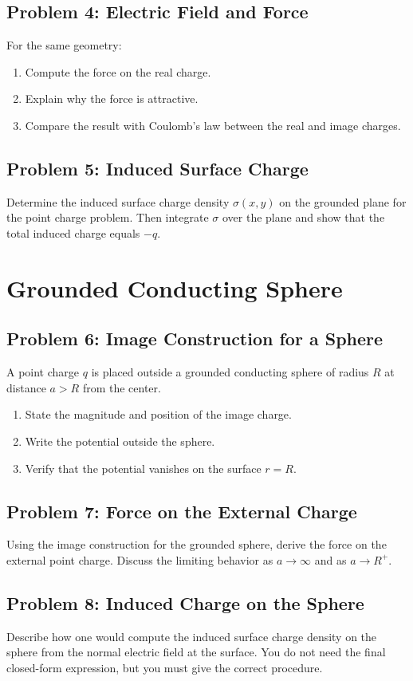 \documentclass[hidelinks]{article}
\begin{document}
\subsection{Problem 4: Electric Field and Force}
For the same geometry:
\begin{enumerate}[label=\alph*)]
\item Compute the force on the real charge.
\item Explain why the force is attractive.
\item Compare the result with Coulomb's law between the real and image charges.
\end{enumerate}

\subsection{Problem 5: Induced Surface Charge}
Determine the induced surface charge density $\sigma(x,y)$ on the grounded plane for the point charge problem. Then integrate $\sigma$ over the plane and show that the total induced charge equals $-q$.

\section{Grounded Conducting Sphere}
\subsection{Problem 6: Image Construction for a Sphere}
A point charge $q$ is placed outside a grounded conducting sphere of radius $R$ at distance $a>R$ from the center.
\begin{enumerate}[label=\alph*)]
\item State the magnitude and position of the image charge.
\item Write the potential outside the sphere.
\item Verify that the potential vanishes on the surface $r=R$.
\end{enumerate}

\subsection{Problem 7: Force on the External Charge}
Using the image construction for the grounded sphere, derive the force on the external point charge. Discuss the limiting behavior as $a\to \infty$ and as $a\to R^+$.

\subsection{Problem 8: Induced Charge on the Sphere}
Describe how one would compute the induced surface charge density on the sphere from the normal electric field at the surface. You do not need the final closed-form expression, but you must give the correct procedure.
\end{document}
